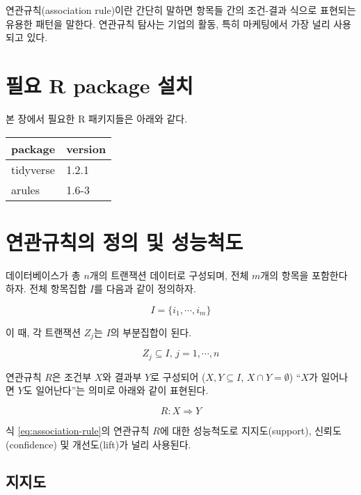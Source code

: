 \documentclass[]{book}
\begin{document}
연관규칙(association rule)이란 간단히 말하면 항목들 간의 조건-결과 식으로 표현되는 유용한 패턴을 말한다. 연관규칙 탐사는 기업의 활동, 특히 마케팅에서 가장 널리 사용되고 있다.

\hypertarget{association-packages-install}{%
\section{필요 R package 설치}\label{association-packages-install}}

본 장에서 필요한 R 패키지들은 아래와 같다.

\begin{tabular}{l|l}
\hline
package & version\\
\hline
tidyverse & 1.2.1\\
\hline
arules & 1.6-3\\
\hline
\end{tabular}

\hypertarget{association-rule-definition-metric}{%
\section{연관규칙의 정의 및 성능척도}\label{association-rule-definition-metric}}

데이터베이스가 총 \(n\)개의 트랜잭션 데이터로 구성되며, 전체 \(m\)개의 항목을 포함한다 하자. 전체 항목집합 \(I\)를 다음과 같이 정의하자.

\begin{equation*}
I = \{ i_1, \cdots, i_m \}
\end{equation*}

이 때, 각 트랜잭션 \(Z_j\)는 \(I\)의 부분집합이 된다.

\begin{equation*}
Z_j \subseteq I, \, j = 1, \cdots, n
\end{equation*}

연관규칙 \(R\)은 조건부 \(X\)와 결과부 \(Y\)로 구성되어 (\(X, Y \subseteq I\), \(X \cap Y = \emptyset\)) ``\(X\)가 일어나면 \(Y\)도 일어난다''는 의미로 아래와 같이 표현된다.

\begin{equation}
R: X \Rightarrow Y \label{eq:association-rule}
\end{equation}

식 \eqref{eq:association-rule}의 연관규칙 \(R\)에 대한 성능척도로 지지도(support), 신뢰도(confidence) 및 개선도(lift)가 널리 사용된다.

\hypertarget{association-rule-support}{%
\subsection{지지도}\label{association-rule-support}}
\end{document}

